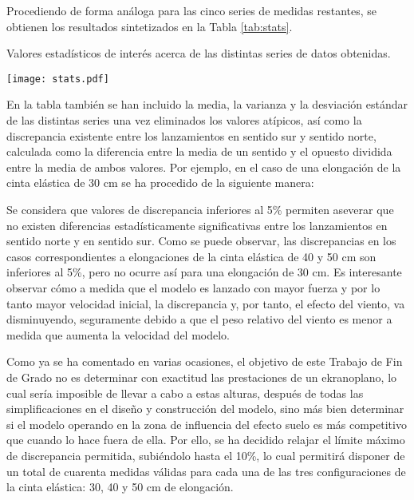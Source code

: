 Procediendo de forma análoga para las cinco series de medidas restantes, se obtienen los resultados sintetizados en la Tabla \ref{tab:stats}.

\begin{table}[ht]
  \centering
  \caption{Valores estadísticos de interés acerca de las distintas series de datos obtenidas.}
  \label{tab:stats}
  \texttt{[image: stats.pdf]}
\end{table}

En la tabla también se han incluido la media, la varianza y la desviación estándar de las distintas series una vez eliminados los valores atípicos, así como la discrepancia existente entre los lanzamientos en sentido sur y sentido norte, calculada como la diferencia entre la media de un sentido y el opuesto dividida entre la media de ambos valores. Por ejemplo, en el caso de una elongación de la cinta elástica de 30 cm se ha procedido de la siguiente manera:


Se considera que valores de discrepancia inferiores al 5\% permiten aseverar que no existen diferencias estadísticamente significativas entre los lanzamientos en sentido norte y en sentido sur. Como se puede observar, las discrepancias en los casos correspondientes a elongaciones de la cinta elástica de 40 y 50 cm son inferiores al 5\%, pero no ocurre así para una elongación de 30 cm. Es interesante observar cómo a medida que el modelo es lanzado con mayor fuerza y por lo tanto mayor velocidad inicial, la discrepancia y, por tanto, el efecto del viento, va disminuyendo, seguramente debido a que el peso relativo del viento es menor a medida que aumenta la velocidad del modelo.

Como ya se ha comentado en varias ocasiones, el objetivo de este Trabajo de Fin de Grado no es determinar con exactitud las prestaciones de un ekranoplano, lo cual sería imposible de llevar a cabo a estas alturas, después de todas las simplificaciones en el diseño y construcción del modelo, sino más bien determinar si el modelo operando en la zona de influencia del efecto suelo es más competitivo que cuando lo hace fuera de ella. Por ello, se ha decidido relajar el límite máximo de discrepancia permitida, subiéndolo hasta el 10\%, lo cual permitirá disponer de un total de cuarenta medidas válidas para cada una de las tres configuraciones de la cinta elástica: 30, 40 y 50 cm de elongación.

